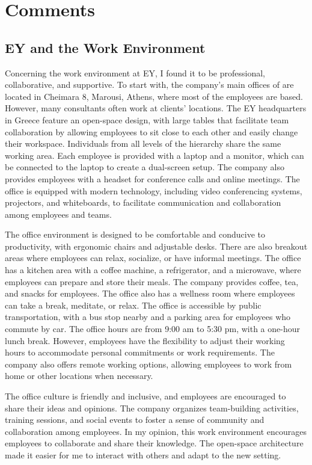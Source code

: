 \chapter{Comments}
\label{ch:comments}

\section{EY and the Work Environment}

Concerning the work environment at EY, I found it to be professional,
collaborative, and supportive. To start with, the company's main offices of are
located in Cheimara 8, Marousi, Athens, where most of the employees are based.
However, many consultants often work at clients' locations. The EY headquarters
in Greece feature an open-space design, with large tables that facilitate team
collaboration by allowing employees to sit close to each other and easily
change their workspace. Individuals from all levels of the hierarchy share the
same working area. Each employee is provided with a laptop and a monitor, which
can be connected to the laptop to create a dual-screen setup. The company also
provides employees with a headset for conference calls and online meetings. The
office is equipped with modern technology, including video conferencing
systems, projectors, and whiteboards, to facilitate communication and
collaboration among employees and teams.

The office environment is designed to be comfortable and conducive to
productivity, with ergonomic chairs and adjustable desks. There are also
breakout areas where employees can relax, socialize, or have informal meetings.
The office has a kitchen area with a coffee machine, a refrigerator, and a
microwave, where employees can prepare and store their meals. The company
provides coffee, tea, and snacks for employees. The office also has a wellness
room where employees can take a break, meditate, or relax. The office is
accessible by public transportation, with a bus stop nearby and a parking area
for employees who commute by car. The office hours are from 9:00 am to 5:30 pm,
with a one-hour lunch break. However, employees have the flexibility to adjust
their working hours to accommodate personal commitments or work requirements.
The company also offers remote working options, allowing employees to work from
home or other locations when necessary.

The office culture is friendly and inclusive, and employees are encouraged to
share their ideas and opinions. The company organizes team-building activities,
training sessions, and social events to foster a sense of community and
collaboration among employees. In my opinion, this work environment encourages
employees to collaborate and share their knowledge. The open-space architecture
made it easier for me to interact with others and adapt to the new setting.

